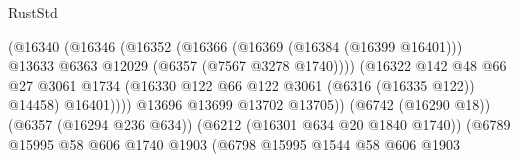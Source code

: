 \begin{lexlean}{RustStd}
\begin{coremodule}
                                                  (@16340
                                                    (@16346
                                                      (@16352
                                                        (@16366
                                                          (@16369 (@16384 (@16399 @16401)))
                                                          @13633
                                                          @6363
                                                          @12029
                                                          (@6357 (@7567 @3278 @1740))))
                                                      (@16322
                                                        @142
                                                        @48
                                                        @66
                                                        @27
                                                        @3061
                                                        @1734
                                                        (@16330
                                                          @122
                                                          @66
                                                          @122
                                                          @3061
                                                          (@6316 (@16335 @122))
                                                          @14458)
                                                        @16401))))
                                                @13696
                                                @13699
                                                @13702
                                                @13705))
                                            (@6742 (@16290 @18))
                                            (@6357 (@16294 @236 @634))
                                            (@6212 (@16301 @634 @20 @1840 @1740))
                                            (@6789
                                              @15995
                                              @58
                                              @606
                                              @1740
                                              @1903
                                              (@6798
                                                @15995
                                                @1544
                                                @58
                                                @606
                                                @1903

\end{coremodule}
\end{lexlean}
